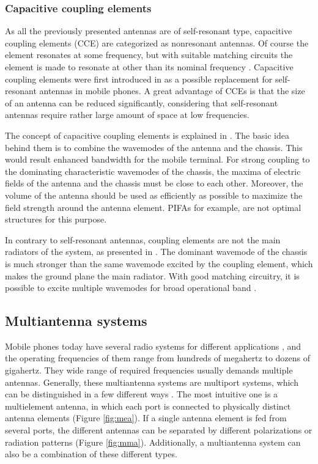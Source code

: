 \subsubsection{Capacitive coupling elements}
\label{sec:cce}
As all the previously presented antennas are of self-resonant type, capacitive coupling elements (CCE) are categorized as nonresonant antennas. Of course the element resonates at some frequency, but with suitable matching circuits the element is made to resonate at other than its nominal frequency \cite{valkonen_cce}. Capacitive coupling elements were first introduced in \cite{vainikainen_resonator_analysis} as a possible replacement for self-resonant antennas in mobile phones. A great advantage of CCEs is that the size of an antenna can be reduced significantly, considering that self-resonant antennas require rather large amount of space at low frequencies. 

The concept of capacitive coupling elements is explained in \cite{vainikainen_resonator_analysis, villanen_cce}. The basic idea behind them is to combine the wavemodes of the antenna and the chassis. This would result enhanced bandwidth for the mobile terminal. For strong coupling to the dominating characteristic wavemodes of the chassis, the maxima of electric fields of the antenna and the chassis must be close to each other. Moreover, the volume of the antenna should be used as efficiently as possible to maximize the field strength around the antenna element. PIFAs for example, are not optimal structures for this purpose. 

In contrary to self-resonant antennas, coupling elements are not the main radiators of the system, as presented in \cite{villanen_cce}. The dominant wavemode of the chassis is much stronger than the same wavemode excited by the coupling element, which makes the ground plane the main radiator. With good matching circuitry, it is possible to excite multiple wavemodes for broad operational band \cite{valkonen_cce}.


\subsection{Multiantenna systems}
\label{sec:multiant}
Mobile phones today have several radio systems for different applications \cite{20ant}, and the operating frequencies of them range from hundreds of megahertz to dozens of gigahertz. They wide range of required frequencies usually demands multiple antennas. Generally, these multiantenna systems are multiport systems, which can be distinguished in a few different ways \cite{multiantenna_mimo_book}. The most intuitive one is a multielement antenna, in which each port is connected to physically distinct antenna elements (Figure \ref{fig:mea}). If a single antenna element is fed from several ports, the different antennas can be separated by different polarizations or radiation patterns (Figure \ref{fig:mma}). Additionally, a multiantenna system can also be a combination of these different types.

